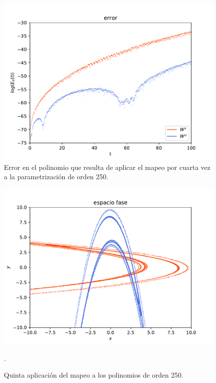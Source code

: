 \begin{figure}[H]
\centering
\includegraphics[scale=0.4]{error4ite}
\caption{Error en el polinomio que resulta de aplicar el mapeo por cuarta vez a la parametrización de orden 250.}
\label{error-4iteracion}
\end{figure}

\begin{figure}[H]
\centering
\includegraphics[scale=0.5]{rectangulo5}
\caption{Quinta aplicación del mapeo a los polinomios de orden 250.}.
\label{Rectangulo5}
\end{figure}

